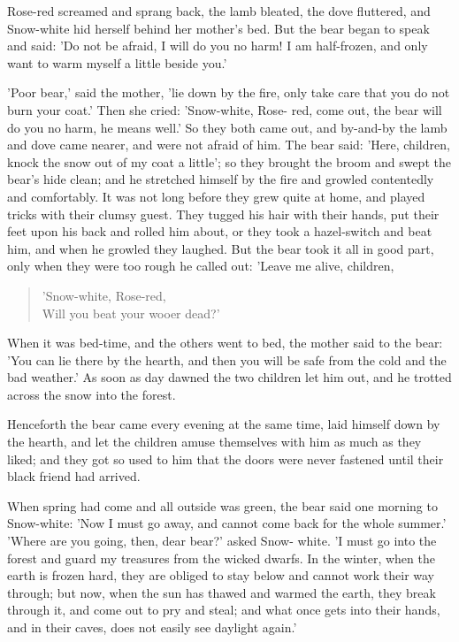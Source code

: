 \documentclass[12pt]{book}
\begin{document}
Rose-red screamed and sprang back, the lamb bleated, the dove
fluttered, and Snow-white hid herself behind her mother's bed. But the
bear began to speak and said: 'Do not be afraid, I will do you no
harm! I am half-frozen, and only want to warm myself a little beside
you.'

'Poor bear,' said the mother, 'lie down by the fire, only take care
that you do not burn your coat.' Then she cried: 'Snow-white, Rose-
red, come out, the bear will do you no harm, he means well.' So they
both came out, and by-and-by the lamb and dove came nearer, and were
not afraid of him. The bear said: 'Here, children, knock the snow out
of my coat a little'; so they brought the broom and swept the bear's
hide clean; and he stretched himself by the fire and growled
contentedly and comfortably. It was not long before they grew quite at
home, and played tricks with their clumsy guest. They tugged his hair
with their hands, put their feet upon his back and rolled him about,
or they took a hazel-switch and beat him, and when he growled they
laughed. But the bear took it all in good part, only when they were
too rough he called out: 'Leave me alive, children,

\begin{verse}
 'Snow-white, Rose-red,\\
  Will you beat your wooer dead?'
\end{verse}

When it was bed-time, and the others went to bed, the mother said to
the bear: 'You can lie there by the hearth, and then you will be safe
from the cold and the bad weather.' As soon as day dawned the two
children let him out, and he trotted across the snow into the forest.

Henceforth the bear came every evening at the same time, laid himself
down by the hearth, and let the children amuse themselves with him as
much as they liked; and they got so used to him that the doors were
never fastened until their black friend had arrived.

When spring had come and all outside was green, the bear said one
morning to Snow-white: 'Now I must go away, and cannot come back for
the whole summer.' 'Where are you going, then, dear bear?' asked Snow-
white. 'I must go into the forest and guard my treasures from the
wicked dwarfs. In the winter, when the earth is frozen hard, they are
obliged to stay below and cannot work their way through; but now, when
the sun has thawed and warmed the earth, they break through it, and
come out to pry and steal; and what once gets into their hands, and in
their caves, does not easily see daylight again.'
\end{document}
